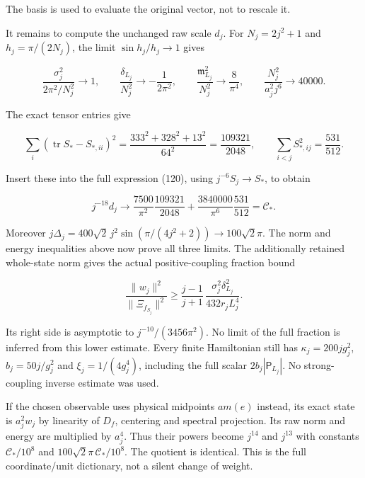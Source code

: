 The basis is used to evaluate the original vector, not to rescale it.

It remains to compute the unchanged raw scale \(d_j\). For
\(N_j=2j^2+1\) and \(h_j=\pi/(2N_j)\), the limit \(\sin h_j/h_j\to1\)
gives

\[
\frac{\sigma_j^2}{2\pi^2/N_j^2}\to1,\qquad
 \frac{\delta_{L_j}}{N_j^2}\to-\frac1{2\pi^2},\qquad
 \frac{\mathfrak m_{L_j}^2}{N_j^2}\to\frac8{\pi^4},
 \qquad \frac{N_j^2}{a_j^2j^6}\to40000.
\]

The exact tensor entries give

\[
\sum_i(\operatorname{tr}S_*-S_{*,ii})^2
 =\frac{333^2+328^2+13^2}{64^2}=\frac{109321}{2048},
 \qquad
 \sum_{i<j}S_{*,ij}^2=\frac{531}{512}.
\]

Insert these into the full expression (120), using \(j^{-6}S_j\to S_*\),
to obtain

\[
j^{-18}d_j\to
 \frac{7500}{\pi^2}\frac{109321}{2048}
 +\frac{3840000}{\pi^6}\frac{531}{512}=\mathcal C_* .
\]

Moreover \(j\Delta_j=400\sqrt2\,j^2\sin(\pi/(4j^2+2))
\to100\sqrt2\pi\). The norm and energy inequalities above now prove all
three limits. The additionally retained whole-state norm gives the
actual positive-coupling fraction bound

\[
\frac{\|w_j\|^2}{\|\Xi_{f_{S_j}}\|^2}
 \ge\frac{j-1}{j+1}\,
 \frac{\sigma_j^2\delta_{L_j}^2}{432r_jL_j^4}.
\]

Its right side is asymptotic to \(j^{-10}/(3456\pi^2)\). No limit of the
full fraction is inferred from this lower estimate. Every finite
Hamiltonian still has \(\kappa_j=200jg_j^2\), \(b_j=50j/g_j^2\) and
\(\xi_j=1/(4g_j^4)\), including the full scalar
\(2b_j|\mathsf P_{L_j}|\). No strong-coupling inverse estimate was used.

If the chosen observable uses physical midpoints \(am(e)\) instead, its
exact state is \(a_j^2w_j\) by linearity of \(D_f\), centering and
spectral projection. Its raw norm and energy are multiplied by
\(a_j^4\). Thus their powers become \(j^{14}\) and \(j^{13}\) with
constants \(\mathcal C_*/10^8\) and \(100\sqrt2\pi\,\mathcal C_*/10^8\).
The quotient is identical. This is the full coordinate/unit dictionary,
not a silent change of weight.

